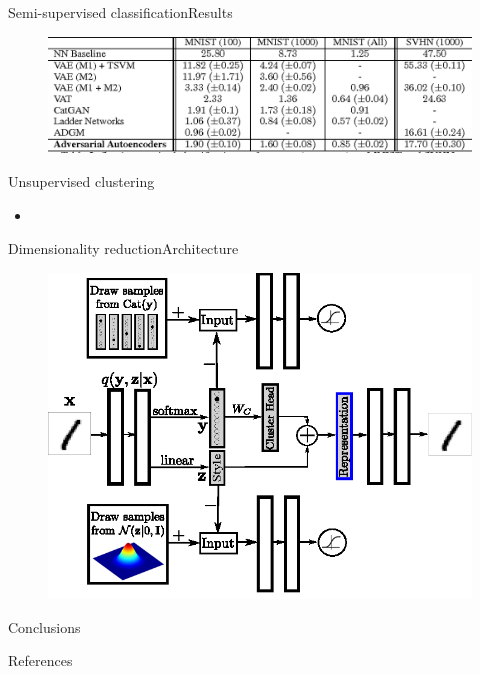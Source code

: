 \documentclass[10pt]{beamer}
\begin{document}
\begin{frame}{Semi-supervised classification}{Results}
\begin{figure}
  \centering
  \includegraphics[width=\linewidth]{../images/performance-table-02.png}
\end{figure}
\end{frame}

\begin{frame}{Unsupervised clustering}
\begin{itemize}
  \item 
\end{itemize}
\end{frame}

\begin{frame}{Dimensionality reduction}{Architecture}
\begin{figure}
  \centering
  \includegraphics[width=0.8\linewidth]{../images/aae-architecture-04.png}
\end{figure}
\end{frame}

\begin{frame}{Conclusions}
\end{frame}

\begin{frame}{References}
\nocite{bengio2013better}
\nocite{bengio2014deep}
\nocite{goodfellow2014generative}
\nocite{kingma2013auto}
\printbibliography
\end{frame}
\end{document}
